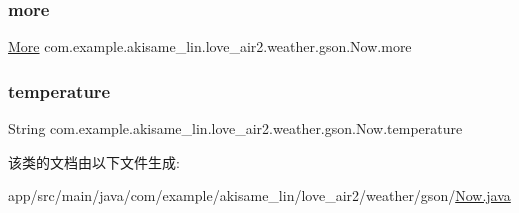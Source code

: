 \subsubsection{\texorpdfstring{more}{more}}
{\footnotesize\ttfamily \mbox{\hyperlink{classcom_1_1example_1_1akisame__lin_1_1love__air2_1_1weather_1_1gson_1_1_now_1_1_more}{More}} com.\+example.\+akisame\+\_\+lin.\+love\+\_\+air2.\+weather.\+gson.\+Now.\+more}

\mbox{\label{classcom_1_1example_1_1akisame__lin_1_1love__air2_1_1weather_1_1gson_1_1_now_a33285f574d0fe17236937be8d306880e}} 
\subsubsection{\texorpdfstring{temperature}{temperature}}
{\footnotesize\ttfamily String com.\+example.\+akisame\+\_\+lin.\+love\+\_\+air2.\+weather.\+gson.\+Now.\+temperature}



该类的文档由以下文件生成\+:\begin{DoxyCompactItemize}
\item 
app/src/main/java/com/example/akisame\+\_\+lin/love\+\_\+air2/weather/gson/\mbox{\hyperlink{java_2com_2example_2akisame__lin_2love__air2_2weather_2gson_2_now_8java}{Now.\+java}}\end{DoxyCompactItemize}
